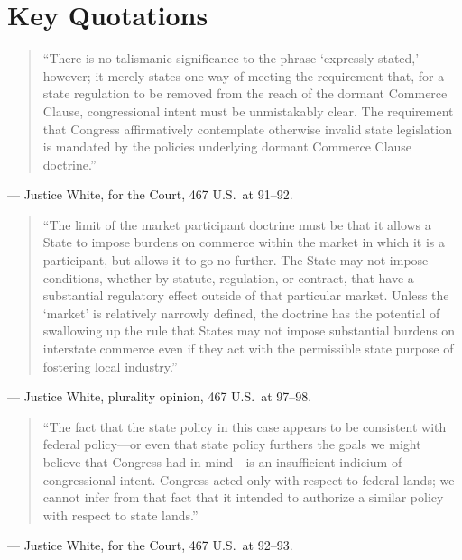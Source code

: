 \documentclass[12pt]{article}
\begin{document}
\section{Key Quotations}

\begin{quote}
``There is no talismanic significance to the phrase `expressly stated,' however; it merely states one way of meeting the requirement that, for a state regulation to be removed from the reach of the dormant Commerce Clause, congressional intent must be unmistakably clear. The requirement that Congress affirmatively contemplate otherwise invalid state legislation is mandated by the policies underlying dormant Commerce Clause doctrine.''
\end{quote}
\noindent --- Justice White, for the Court, 467 U.S.\ at 91--92.

\begin{quote}
``The limit of the market participant doctrine must be that it allows a State to impose burdens on commerce within the market in which it is a participant, but allows it to go no further. The State may not impose conditions, whether by statute, regulation, or contract, that have a substantial regulatory effect outside of that particular market. Unless the `market' is relatively narrowly defined, the doctrine has the potential of swallowing up the rule that States may not impose substantial burdens on interstate commerce even if they act with the permissible state purpose of fostering local industry.''
\end{quote}
\noindent --- Justice White, plurality opinion, 467 U.S.\ at 97--98.

\begin{quote}\sloppy
``The fact that the state policy in this case appears to be consistent with federal policy---or even that state policy furthers the goals we might believe that Congress had in mind---is an insufficient indicium of congressional intent. Congress acted only with respect to federal lands; we cannot infer from that fact that it intended to authorize a similar policy with respect to state lands.''
\end{quote}
\noindent --- Justice White, for the Court, 467 U.S.\ at 92--93.
\end{document}
